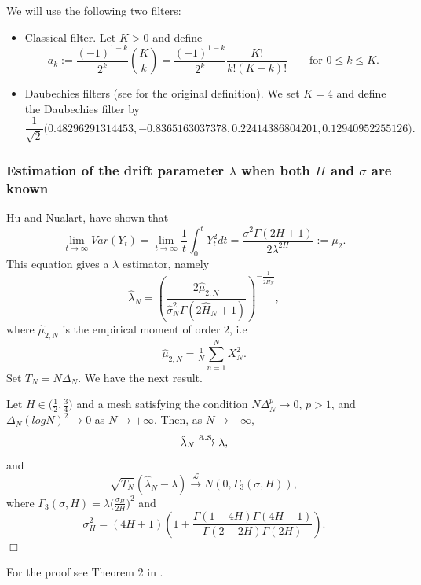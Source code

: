 \documentclass[smallextended]{svjour3}
\begin{document}
We will use the following two filters:
\begin{itemize}
    \item Classical filter. Let $K>0$ and define
    \begin{equation*}
    a_k:= \frac{(-1)^{1-k}}{2^k} {K\choose k} =\frac{(-1)^{1-k}}{2^k}
    \frac{K!}{k!(K-k)!}\qquad \mbox{for }  0\le k\le K.
    \end{equation*}


    \item Daubechies filters (see \cite{de} for the original definition). We
    set $K=4$ and define the Daubechies filter by
    \begin{equation*}
    \frac{1}{\sqrt{2}} \big(0.48296291314453, -0.8365163037378,
    0.22414386804201, 0.12940952255126\big).
    \end{equation*}

\end{itemize}



\subsubsection{Estimation of the drift parameter $\lambda$ when both $H$ and
$\sigma$ are known}

Hu and Nualart, \cite{hu-nu} have shown that
\[
\lim_{t\rightarrow \infty} Var (Y_t)= \lim_{t\rightarrow \infty}
\frac{1}{t}\int_0^t Y_t^2 dt = \frac{\sigma^2 \Gamma(2H+1) }
{2\lambda^{2H}}:=\mu_2.
\]
This equation gives a $\lambda$ estimator, namely
\begin{equation}
\hat{\lambda}_N = \left(\frac{2\hat{\mu}_{2,N}}{\hat{\sigma}_N^2
\Gamma(2\hat{H}_N+1) }  \right)^{-\tfrac{1}{2\hat{H}_N}},\label{est3}
\end{equation}
where $\hat{\mu}_{2,N}$ is the empirical moment of order $2$, i.e
\[
\hat{\mu}_{2,N} =\tfrac{1}{N}\sum_{n=1}^N X_N^2.
\]
Set $T_N=N\Delta_N$. We have the next result.
\begin{theorem}
    Let $H \in \big(\tfrac{1}{2} , \tfrac{3}{4}\big)$ and a mesh satisfying the
    condition $N \Delta_N^p\rightarrow 0$, $p>1$,
    and $ \Delta_N (log N )^2 \rightarrow 0$ as $N \rightarrow +\infty$. Then,
    as $N \rightarrow +\infty$,
    \[
    \hat{\lambda}_N \stackrel{\hbox{\rm a.s.}}{\longrightarrow}  \lambda,
    \]
    and
    \[
    \sqrt{T_N} ( \hat{\lambda}_N -\lambda)
    \stackrel{\mathcal{L}}{\longrightarrow} N (0, \Gamma_3 (\sigma,H)),
    \]
    where $\Gamma_3 (\sigma,H)=\lambda \big(\tfrac{\sigma_H}{2H} \big)^2$ and
    \[
    \sigma_H^2= (4H+1)\left(1+\frac{\Gamma(1-4H)\Gamma(4H-1)
    }{\Gamma(2-2H)\Gamma(2H)} \right).
    \]
    \hfill$\Box$
\end{theorem}
For the proof see Theorem 2 in \cite{br-ia}.\\
\end{document}

